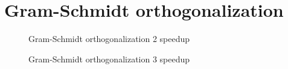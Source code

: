\section{Gram-Schmidt orthogonalization}

\begin{figure}[h]
  \begin{center}
  \end{center}
  \caption{Gram-Schmidt orthogonalization 2 speedup}
  \label{fig:gram2}
\end{figure}

\begin{figure}[h]
  \begin{center}
  \end{center}
  \caption{Gram-Schmidt orthogonalization 3 speedup}
  \label{fig:gram3}
\end{figure}


